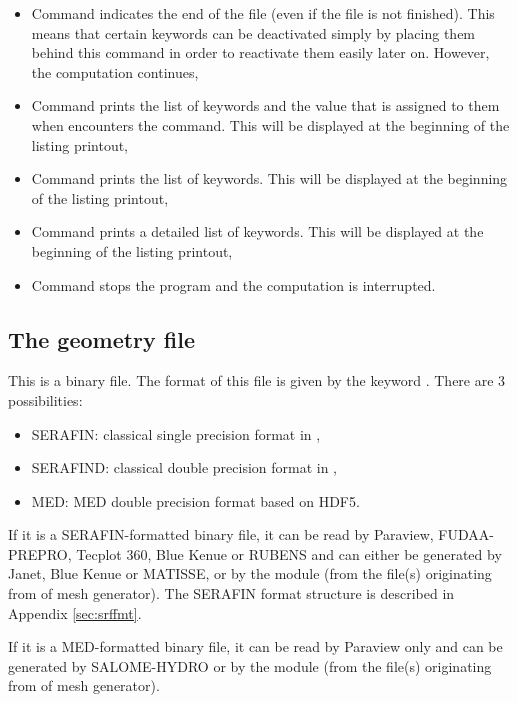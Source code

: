 \begin{itemize}
\item Command  indicates the end of the file
(even if the file is not finished).
This means that certain keywords can be deactivated simply by placing them
behind this command in order to reactivate them easily later on.
However, the computation continues,

\item Command  prints the list of keywords and the value
that is assigned to them when \damo encounters the command.
This will be displayed at the beginning of the listing printout,

\item Command  prints the list of keywords.
This will be displayed at the beginning of the listing printout,

\item Command  prints a detailed list of keywords.
This will be displayed at the beginning of the listing printout,

\item Command  stops the program and the computation is
interrupted.
\end{itemize}


\subsection{The geometry file}

This is a binary file.
The format of this file is given by the keyword .
There are 3 possibilities:
\begin{itemize}
\item SERAFIN: classical single precision format in \tel,
\item SERAFIND: classical double precision format in \tel,
\item MED: MED double precision format based on HDF5.
\end{itemize}

If it is a SERAFIN-formatted binary file, it can be read by
Paraview, FUDAA-PREPRO, Tecplot 360, Blue Kenue or RUBENS
and can either be generated by Janet, Blue Kenue or MATISSE,
or by the \stbtel module (from the file(s) originating from of mesh generator).
The SERAFIN format structure is described in Appendix \ref{sec:srffmt}.

If it is a MED-formatted binary file, it can be read by
Paraview only and can be generated by SALOME-HYDRO
or by the \stbtel module (from the file(s) originating from of mesh generator).


